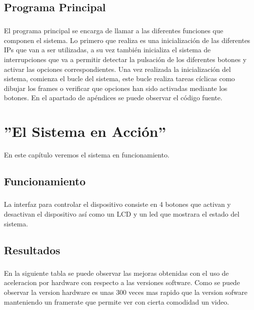 \documentclass[a4paper,12pt,titlepage,final]{book}
\begin{document}
\section{Programa Principal}
\paragraph{}
El programa principal se encarga de llamar a las diferentes funciones que componen el sistema. Lo primero que realiza es una inicialización de las diferentes IPs que van a ser utilizadas, a su vez también inicializa el sistema de interrupciones que va a permitir detectar la pulsación de los diferentes botones y activar las opciones correspondientes. Una vez realizada la inicialización del sistema, comienza el bucle del sistema, este bucle realiza tareas cíclicas como dibujar los frames o verificar que opciones han sido activadas mediante los botones. En el apartado de apéndices se puede observar el código fuente.


\chapter{''El Sistema en Acción''}
En este capítulo veremos el sistema en funcionamiento.

\section{Funcionamiento}
\subsection*{}
\subsubsection*{}
La interfaz para controlar el dispositivo consiste en 4 botones que activan y desactivan el dispositivo así como un LCD y un led que mostrara el estado del sistema.

\section{Resultados}
\subsection*{}
\subsubsection*{}
En la siguiente tabla se puede observar las mejoras obtenidas con el uso de aceleracion por hardware con respecto a las versiones software. Como se puede observar la version hardware es unas 300 veces mas rapido que la version sofware manteniendo un framerate que permite ver con cierta comodidad un video.
\end{document}
